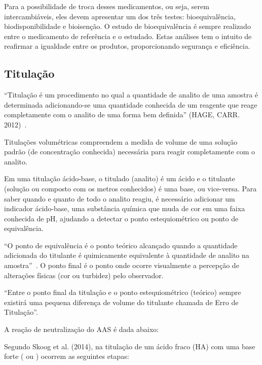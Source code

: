 Para a possibilidade de troca desses medicamentos, ou seja, serem intercambiáveis, eles devem
apresentar um dos três testes: bioequivalência, biodisponibilidade e bioisenção. O estudo de
bioequivalência é sempre realizado entre o medicamento de referência e o estudado. Estas análises
tem o intuito de reafirmar a igualdade entre os produtos, proporcionando segurança e
eficiência.~\cite{ache2015}

\subsection{Titulação}\label{titulacao}

``Titulação é um procedimento no qual a quantidade de analito de uma amostra é determinada
adicionando-se uma quantidade conhecida de um reagente que reage completamente com o analito de uma
forma bem definida'' (HAGE, CARR. 2012)~\cite{Hage2012}.

Titulações volumétricas compreendem a medida de volume de uma solução padrão (de concentração
conhecida) necessária para reagir completamente com o analito.~\cite{Skoog2014}

Em uma titulação ácido-base, o titulado (analito) é um ácido e o titulante (solução ou composto com
os metros conhecidos) é uma base, ou vice-versa. Para saber quando e quanto de todo o analito
reagiu, é necessário adicionar um indicador ácido-base, uma substância química que muda de cor em
uma faixa conhecida de pH, ajudando a detectar o ponto estequiométrico ou ponto de equivalência.

``O ponto de equivalência é o ponto teórico alcançado quando a quantidade adicionada do titulante é
quimicamente equivalente à quantidade de analito na amostra''~\cite{Skoog2014}. O ponto final é o
ponto onde ocorre visualmente a percepção de alterações físicas (cor ou turbidez) pelo observador.

“Entre o ponto final da titulação e o ponto estequiométrico (teórico) sempre existirá uma pequena
diferença de volume do titulante chamada de Erro de Titulação”.~\cite{Ruy1999}

A reação de neutralização do AAS é dada abaixo:

\begin{center}
\end{center} 

Segundo Skoog et al. (2014), na titulação de um ácido fraco (HA) com uma base forte ( ou
) ocorrem as seguintes etapas:

